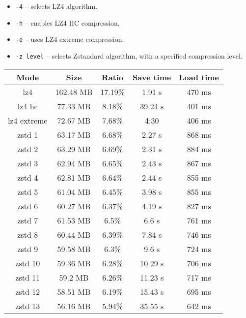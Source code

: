 \documentclass[hidelinks,titlepage,a4paper,twoside]{article}
\begin{document}
\begin{itemize}
\item \texttt{-4} -- selects LZ4 algorithm.
\item \texttt{-h} -- enables LZ4 HC compression.
\item \texttt{-e} -- uses LZ4 extreme compression.
\item \texttt{-z level} -- selects Zstandard algorithm, with a specified compression level.
\end{itemize}

\begin{table}
\centering
\begin{tabular}[h]{c|c|c|c|c}
\textbf{Mode} & \textbf{Size} & \textbf{Ratio} & \textbf{Save time} & \textbf{Load time} \\ \hline
lz4 & 162.48 MB & 17.19\% & 1.91 \si{\second} & 470 \si{\milli\second} \\
lz4 hc & 77.33 MB & 8.18\% & 39.24 \si{\second} & 401 \si{\milli\second} \\
lz4 extreme & 72.67 MB & 7.68\% & 4:30 & 406 \si{\milli\second} \\ \hline
zstd 1 & 63.17 MB & 6.68\% & 2.27 \si{\second} & 868 \si{\milli\second} \\
zstd 2 & 63.29 MB & 6.69\% & 2.31 \si{\second} & 884 \si{\milli\second} \\
zstd 3 & 62.94 MB & 6.65\% & 2.43 \si{\second} & 867 \si{\milli\second} \\
zstd 4 & 62.81 MB & 6.64\% & 2.44 \si{\second} & 855 \si{\milli\second} \\
zstd 5 & 61.04 MB & 6.45\% & 3.98 \si{\second} & 855 \si{\milli\second} \\
zstd 6 & 60.27 MB & 6.37\% & 4.19 \si{\second} & 827 \si{\milli\second} \\
zstd 7 & 61.53 MB & 6.5\% & 6.6 \si{\second} & 761 \si{\milli\second} \\
zstd 8 & 60.44 MB & 6.39\% & 7.84 \si{\second} & 746 \si{\milli\second} \\
zstd 9 & 59.58 MB & 6.3\% & 9.6 \si{\second} & 724 \si{\milli\second} \\
zstd 10 & 59.36 MB & 6.28\% & 10.29 \si{\second} & 706 \si{\milli\second} \\
zstd 11 & 59.2 MB & 6.26\% & 11.23 \si{\second} & 717 \si{\milli\second} \\
zstd 12 & 58.51 MB & 6.19\% & 15.43 \si{\second} & 695 \si{\milli\second} \\
zstd 13 & 56.16 MB & 5.94\% & 35.55 \si{\second} & 642 \si{\milli\second} \\

\end{tabular}
\end{table}
\end{document}
